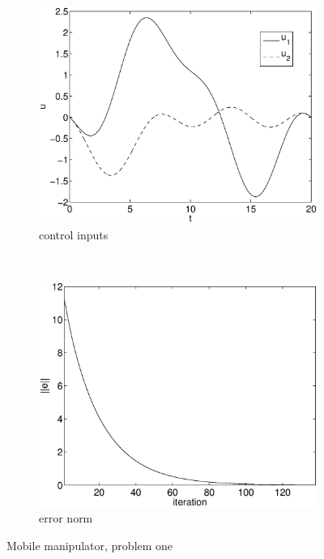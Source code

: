 \begin{figure}[h]
\begin{subfigure}[b]{0.45\textwidth}
\centering
\includegraphics[width=\textwidth]{img/manip_task_u.eps}
\caption{control inputs}
\end{subfigure}
~
\begin{subfigure}[b]{0.45\textwidth}
\centering
\includegraphics[width=\textwidth]{img/manip_task_err.eps}
\caption{error norm}
\end{subfigure}
\caption{Mobile manipulator, problem one}
\label{fig:pr1}
\end{figure}

